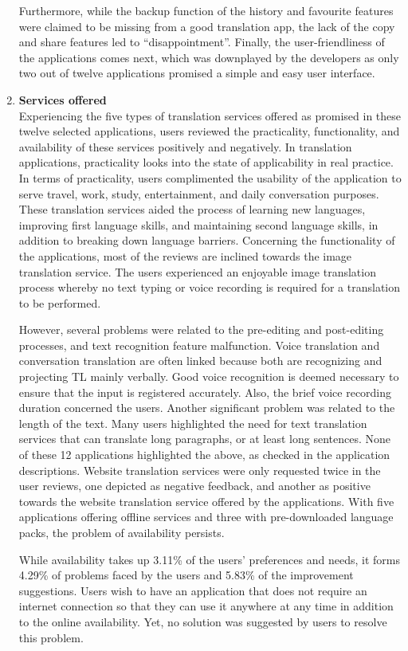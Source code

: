 \documentclass[english]{textolivre}
\begin{document}
\begin{enumerate}
	Furthermore, while the backup function of the history and favourite features were claimed to be missing from a good translation app, the lack of the copy and share features led to “disappointment”. Finally, the user-friendliness of the applications comes next, which was downplayed by the developers as only two out of twelve applications promised a simple and easy user interface.
 \item \textbf{Services offered} \\
 Experiencing the five types of translation services offered as promised in these twelve selected applications, users reviewed the practicality, functionality, and availability of these services positively and negatively. In translation applications, practicality looks into the state of applicability in real practice. In terms of practicality, users complimented the usability of the application to serve travel, work, study, entertainment, and daily conversation purposes. These translation services aided the process of learning new languages, improving first language skills, and maintaining second language skills, in addition to breaking down language barriers. Concerning the functionality of the applications, most of the reviews are inclined towards the image translation service. The users experienced an enjoyable image translation process whereby no text typing or voice recording is required for a translation to be performed.

However, several problems were related to the pre-editing and post-editing processes, and text recognition feature malfunction. Voice translation and conversation translation are often linked because both are recognizing and projecting TL mainly verbally. Good voice recognition is deemed necessary to ensure that the input is registered accurately. Also, the brief voice recording duration concerned the users. Another significant problem was related to the length of the text. Many users highlighted the need for text translation services that can translate long paragraphs, or at least long sentences. None of these 12 applications highlighted the above, as checked in the application descriptions. Website translation services were only requested twice in the user reviews, one depicted as negative feedback, and another as positive towards the website translation service offered by the applications. With five applications offering offline services and three with pre-downloaded language packs, the problem of availability persists.
 
While availability takes up 3.11\% of the users’ preferences and needs, it forms 4.29\% of problems faced by the users and 5.83\% of the improvement suggestions. Users wish to have an application that does not require an internet connection so that they can use it anywhere at any time in addition to the online availability. Yet, no solution was suggested by users to resolve this problem.


\end{enumerate}
\end{document}
